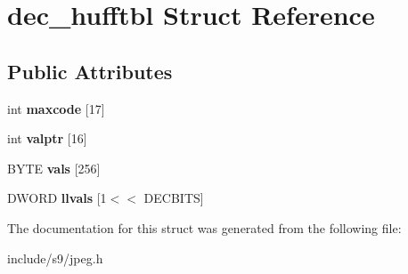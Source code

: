 \hypertarget{structdec__hufftbl}{\section{dec\-\_\-hufftbl \-Struct \-Reference}
\label{structdec__hufftbl}
}
\subsection*{\-Public \-Attributes}
\begin{DoxyCompactItemize}
\item 
\hypertarget{structdec__hufftbl_a8b500876289dda1731ca4360ed8dc4e6}{int {\bfseries maxcode} \mbox{[}17\mbox{]}}\label{structdec__hufftbl_a8b500876289dda1731ca4360ed8dc4e6}

\item 
\hypertarget{structdec__hufftbl_a4011f65e72d693639c5a353c386a7519}{int {\bfseries valptr} \mbox{[}16\mbox{]}}\label{structdec__hufftbl_a4011f65e72d693639c5a353c386a7519}

\item 
\hypertarget{structdec__hufftbl_a91e35217d39149d2f98b896f65d0bc33}{\-B\-Y\-T\-E {\bfseries vals} \mbox{[}256\mbox{]}}\label{structdec__hufftbl_a91e35217d39149d2f98b896f65d0bc33}

\item 
\hypertarget{structdec__hufftbl_a286111323bdb40b2032f7c441f9c311d}{\-D\-W\-O\-R\-D {\bfseries llvals} \mbox{[}1$<$$<$ \-D\-E\-C\-B\-I\-T\-S\mbox{]}}\label{structdec__hufftbl_a286111323bdb40b2032f7c441f9c311d}

\end{DoxyCompactItemize}


\-The documentation for this struct was generated from the following file\-:\begin{DoxyCompactItemize}
\item 
include/s9/jpeg.\-h\end{DoxyCompactItemize}

